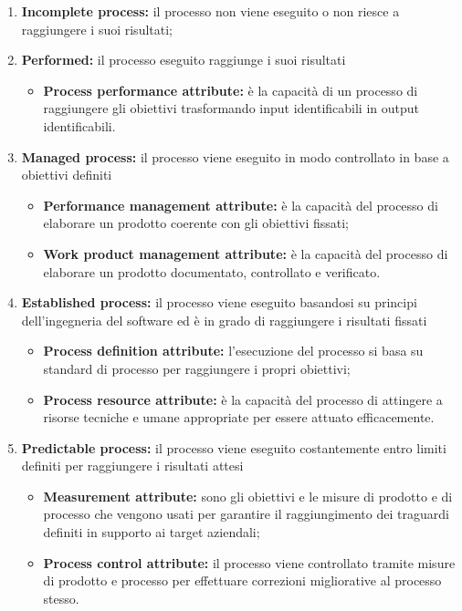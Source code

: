 \begin{enumerate}[label*=\arabic*]
	\item \textbf{Incomplete process:} il processo non viene eseguito o non riesce a raggiungere i suoi risultati;
	
	\item \textbf{Performed:} il processo eseguito raggiunge i suoi risultati
		\begin{itemize}
			\item \textbf{Process performance attribute:} è la capacità di un processo di raggiungere gli obiettivi trasformando input identificabili in output identificabili.
		\end{itemize}
		
	\item \textbf{Managed process:} il processo viene eseguito in modo controllato in base a obiettivi definiti
		\begin{itemize}
			\item \textbf{Performance management attribute:} è la capacità del processo di elaborare un prodotto coerente con gli obiettivi fissati;
			\item \textbf{Work product management attribute:} è la capacità del processo di elaborare un prodotto documentato, controllato e verificato.
		\end{itemize}
		
		
	\item \textbf{Established process:} il processo viene eseguito basandosi su principi dell'ingegneria del software ed è in grado di raggiungere i risultati fissati
		\begin{itemize}
			\item \textbf{Process definition attribute:} l'esecuzione del processo si basa su standard di processo per raggiungere i propri obiettivi;
			\item \textbf{Process resource attribute:} è la capacità del processo di attingere a risorse tecniche e umane appropriate per essere attuato efficacemente.
		\end{itemize}
		
	\item \textbf{Predictable process:} il processo viene eseguito costantemente entro limiti definiti per raggiungere i risultati attesi
		\begin{itemize}
			\item\textbf{Measurement attribute:} sono gli obiettivi e le misure di prodotto e di processo che vengono usati per garantire il raggiungimento dei traguardi definiti in supporto ai target aziendali;
			\item \textbf{Process control attribute:} il processo viene controllato tramite misure di prodotto e processo per effettuare correzioni migliorative al processo stesso.
		\end{itemize}
		

\end{enumerate}
